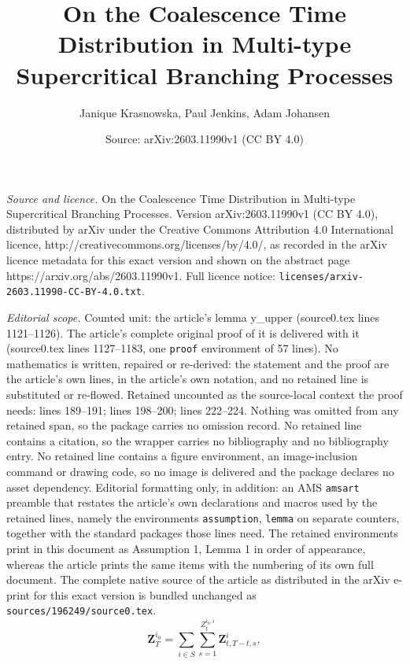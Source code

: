 \documentclass[10pt,a4paper]{amsart}
\title{On the Coalescence Time Distribution in Multi-type Supercritical Branching Processes}
\author{Janique Krasnowska, Paul Jenkins, Adam Johansen}
\date{Source: arXiv:2603.11990v1 (CC BY 4.0)}
\begin{document}
\maketitle

\noindent\emph{Source and licence.} On the Coalescence Time Distribution in Multi-type Supercritical Branching Processes. Version arXiv:2603.11990v1 (CC BY 4.0), distributed by arXiv under the Creative Commons Attribution 4.0 International licence, http://creativecommons.org/licenses/by/4.0/, as recorded in the arXiv licence metadata for this exact version and shown on the abstract page https://arxiv.org/abs/2603.11990v1. Full licence notice: \texttt{licenses/arxiv-2603.11990-CC-BY-4.0.txt}.\par\smallskip

\noindent\textit{Editorial scope.} Counted unit: the article's lemma y\_upper (source0.tex lines 1121--1126). The article's complete original proof of it is delivered with it (source0.tex lines 1127--1183, one \texttt{proof} environment of 57 lines). No mathematics is written, repaired or re-derived: the statement and the proof are the article's own lines, in the article's own notation, and no retained line is substituted or re-flowed.  Retained uncounted as the source-local context the proof needs: lines 189--191; lines 198--200; lines 222--224.  Nothing was omitted from any retained span, so the package carries no omission record.  No retained line contains a citation, so the wrapper carries no bibliography and no bibliography entry.  No retained line contains a figure environment, an image-inclusion command or drawing code, so no image is delivered and the package declares no asset dependency.  Editorial formatting only, in addition: an AMS \texttt{amsart} preamble that restates the article's own declarations and macros used by the retained lines, namely the environments \texttt{assumption}, \texttt{lemma} on separate counters, together with the standard packages those lines need.  The retained environments print in this document as Assumption 1, Lemma 1 in order of appearance, whereas the article prints the same items with the numbering of its own full document.  The complete native source of the article as distributed in the arXiv e-print for this exact version is bundled unchanged as \texttt{sources/196249/source0.tex}.
\begin{equation}\label{eq:Zdecomposition}
\boldsymbol{Z}^{i_0}_T = \sum_{i\in S}\sum_{s=1}^{Z_t^{i_0, i}} \boldsymbol{Z}^i_{t,T-t,s},
\end{equation}
\end{document}
